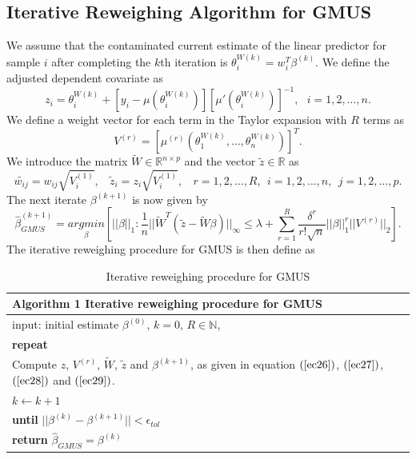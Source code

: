 \documentclass[a4paper,12pt,openany]{report}
\theoremstyle{plain}
\theoremstyle{plain}
\theoremstyle{plain}
\theoremstyle{plain}
\theoremstyle{plain}
\theoremstyle{plain}
\theoremstyle{plain}
\theoremstyle{plain}
\theoremstyle{plain}
\theoremstyle{plain}
\theoremstyle{plain}
\theoremstyle{plain}
\begin{document}
\subsection{Iterative Reweighing Algorithm for GMUS}
We assume that the contaminated current estimate of the linear predictor for sample $i$ after completing the $k$th iteration is $\theta_i^{W(k)} = w_i^T\beta^{(k)}$.
We define the adjusted dependent covariate as
\begin{equation}\label{ec26}
z_i = \theta_i^{W(k)} + \left[y_i-\mu\left(\theta_i^{W(k)}\right)\right]\left[\mu'\left(\theta_i^{W(k)}\right)\right]^{-1}, \ \ \ i=1,2,\dots,n.
\end{equation}
We define a weight vector for each term in the Taylor expansion with $R$ terms as
\begin{equation}\label{ec27}
V^{(r)} = \left[\mu^{(r)}\left(\theta_1^{W(k)}, \dots, \theta_n^{W(k)}\right)\right]^T.
\end{equation}
We introduce the matrix $\tilde{W}\in\mathbb{R}^{n\times p}$ and the vector $\tilde{z}\in\mathbb{R}$ as
\begin{equation}\label{ec28}
\tilde{w_{ij}} = w_{ij}\sqrt{V_i^{(1)}}, \ \  \ \ \tilde{z}_i = z_i\sqrt{V_i^{(1)}}, \ \  \ \ r=1, 2, \ldots, R, \ \ i=1, 2, \ldots, n, \ \ j=1, 2, \ldots, p.
\end{equation}
The next iterate $\beta^{(k+1)}$ is now given by
\begin{equation}\label{ec29}
\hat{\beta}_{GMUS}^{(k+1)} = \underset{\beta}{argmin}\left[||\beta||_1 :  \frac{1}{n}||\tilde{W}^T(\tilde{z}-\tilde{W}\beta)||_{\infty} \leq \lambda + \sum_{r=1}^{R}\frac{\delta^r}{r!\sqrt{n}}||\beta||_{1}^{r}||V^{(r)}||_2\right].
\end{equation}
 The iterative reweighing procedure for GMUS is then define as
\begin{table}
	\begin{tabular}{l}
		\hline
		\textbf{Algorithm 1} Iterative reweighing procedure for GMUS\\
		\hline
		input: initial estimate $\beta^{(0)}$, $k=0$, $R\in\mathbb{N}$,\\
		\textbf{repeat}\\
		Compute $z$, $V^{(r)}$, $\tilde{W}$, $\tilde{z}$ and $\beta^{(k+1)}$, as given in equation $(\ref{ec26})$, $(\ref{ec27})$, $(\ref{ec28})$ and $(\ref{ec29})$.\\
		$k\leftarrow k+1$\\
		\textbf{until} $||\beta^{(k)}-\beta^{(k+1)}||< \epsilon_{tol}$\\
		\textbf{return} $\hat{\beta}_{GMUS}=\beta^{(k)}$\\
		\hline
	\end{tabular}
\caption{Iterative reweighing procedure for GMUS}
\end{table}
\end{document}
